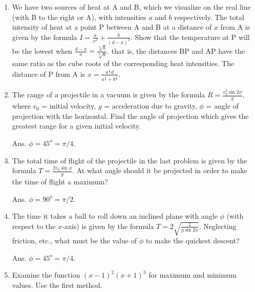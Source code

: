 \begin{enumerate}
\item
We have two sources of heat at A and B, which we visualize on the
real line (with B to the right or A), with intensities $a$ and $b$ respectively. 
%
%
The total intensity of heat at a point P between A and B at a distance of $x$ from A 
is given by the formula
$I = \frac{a}{x^2} + \frac{b}{(d - x)^2}$.
Show that the temperature at P will be the lowest when
$    \frac{d - x}{x} = \frac{\sqrt[3]{b}}{\sqrt[3]{a}}$.
that is, the distances BP and AP have the same ratio as the cube roots 
of the corresponding heat intensities. The distance of P from A is
$x = \frac{a^{\frac{1}{3}} d}{a^{\frac{1}{3}} + b^{\frac{1}{3}} }$.
 
\item
The range of a projectile in a vacuum is given by the formula
$ R = \frac{v_0^2 \sin 2\phi}{g}$,
where $v_0$ = initial velocity, $g$ = acceleration due to gravity, 
$\phi$ = angle of projection with the horizontal. 
Find the angle of projection which gives the greatest range for a 
given initial velocity.

Ans. $\phi  = 45^o=\pi/4$.

\item
The total time of flight of the projectile in the last problem is given by the formula
$   T = \frac{2v_0 \sin \phi}{g}$.
At what angle should it be projected in order to make the time of flight a maximum?

Ans. $\phi  = 90^o=\pi/2$.

\item
The time it takes a ball to roll down an inclined plane with angle
$\phi$ (with respect to the $x$-axis) is given by the formula
$ T = 2\sqrt{\frac{2}{g \sin 2\phi}}$.
Neglecting friction, etc., what must be the value of $\phi$ to 
make the quickest descent?

Ans. $\phi  = 45^o=\pi/4$.

\item
Examine the function $(x - 1)^2(x + 1)^3$ for maximum and minimum 
values. Use the first method.


\end{enumerate}
